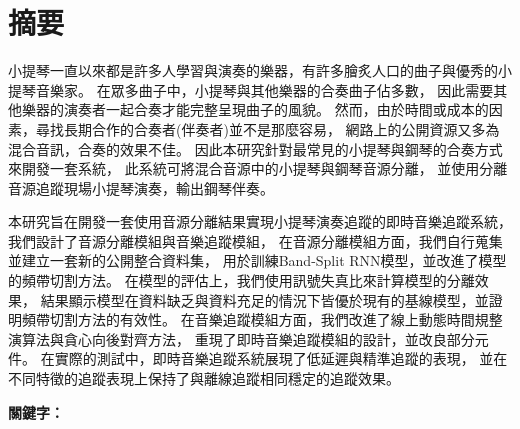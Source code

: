 \documentclass[class=NCU_thesis, crop=false]{standalone}
\begin{document}
\chapter{摘要}
小提琴一直以來都是許多人學習與演奏的樂器，有許多膾炙人口的曲子與優秀的小提琴音樂家。
在眾多曲子中，小提琴與其他樂器的合奏曲子佔多數，
因此需要其他樂器的演奏者一起合奏才能完整呈現曲子的風貌。
然而，由於時間或成本的因素，尋找長期合作的合奏者(伴奏者)並不是那麼容易，
網路上的公開資源又多為混合音訊，合奏的效果不佳。
因此本研究針對最常見的小提琴與鋼琴的合奏方式來開發一套系統，
此系統可將混合音源中的小提琴與鋼琴音源分離，
並使用分離音源追蹤現場小提琴演奏，輸出鋼琴伴奏。

本研究旨在開發一套使用音源分離結果實現小提琴演奏追蹤的即時音樂追蹤系統，
我們設計了音源分離模組與音樂追蹤模組，
在音源分離模組方面，我們自行蒐集並建立一套新的公開整合資料集，
用於訓練Band-Split RNN模型，並改進了模型的頻帶切割方法。
在模型的評估上，我們使用訊號失真比來計算模型的分離效果，
結果顯示模型在資料缺乏與資料充足的情況下皆優於現有的基線模型，並證明頻帶切割方法的有效性。
在音樂追蹤模組方面，我們改進了線上動態時間規整演算法與貪心向後對齊方法，
重現了即時音樂追蹤模組的設計，並改良部分元件。
在實際的測試中，即時音樂追蹤系統展現了低延遲與精準追蹤的表現，
並在不同特徵的追蹤表現上保持了與離線追蹤相同穩定的追蹤效果。


\vspace{2em}
\noindent \textbf{關鍵字：} \keywordsZh{} %
\end{document}
